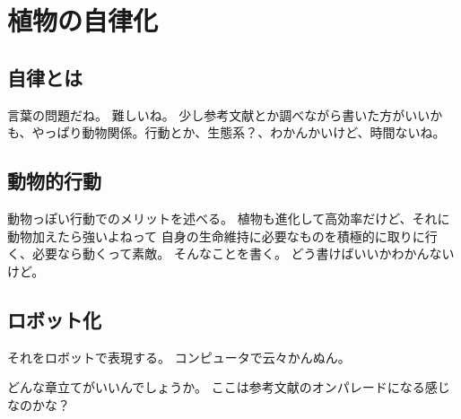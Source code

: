 \chapter{植物の自律化}
\section{自律とは}
言葉の問題だね。
難しいね。
少し参考文献とか調べながら書いた方がいいかも、やっぱり動物関係。行動とか、生態系？、わかんかいけど、時間ないね。
\section{動物的行動}
動物っぽい行動でのメリットを述べる。
植物も進化して高効率だけど、それに動物加えたら強いよねって
自身の生命維持に必要なものを積極的に取りに行く、必要なら動くって素敵。
そんなことを書く。
どう書けばいいかわかんないけど。
\section{ロボット化}
それをロボットで表現する。
コンピュータで云々かんぬん。

どんな章立てがいいんでしょうか。
ここは参考文献のオンパレードになる感じなのかな？
